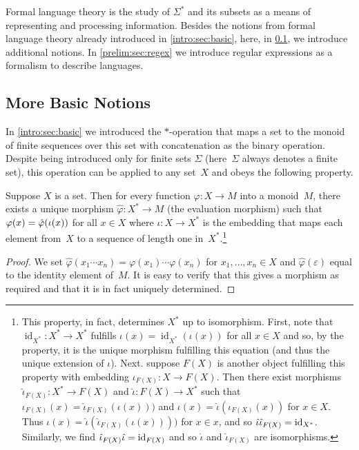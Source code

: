 
Formal language theory is the study of $\Sigma^*$ and its subsets as a means of representing and processing information.
Besides the notions from formal language theory already introduced in \cref{intro:sec:basic},
here, in \cref{prelim:sec:formallang:basics}, 
we introduce additional notions. In \cref{prelim:sec:regex} we introduce regular expressions 
as a formalism to describe languages.

\subsection{More Basic Notions}
\label{prelim:sec:formallang:basics}

In \cref{intro:sec:basic} we introduced the $*$-operation that maps a set to the monoid
of finite sequences over this set with concatenation as the binary operation.
Despite being introduced only for finite sets $\Sigma$ (here~$\Sigma$ always denotes a finite set),
this operation can be applied to any set~$X$ and obeys the following property.

\begin{proposition} 
	\label{prelim:prop:UMP}
	Suppose $X$ is a set. Then for every function $\varphi \colon X \to M$
	into a monoid~$M$, there exists a unique morphism $\hat \varphi \colon X^* \to M$ (the evaluation morphism)
	such that $\varphi(x) = \hat \varphi(\iota(x))$ for all $x \in X$
	where $\iota \colon X \to X^*$ is the embedding that maps each element from~$X$
	to a sequence of length one in~$X^*$.\footnote{This property, in fact,
		determines $X^*$ up to isomorphism.
		First, note that $\operatorname{id}_{X^*} \colon X^* \to X^*$
		fulfills $\iota(x) = \operatorname{id}_{X^*}(\iota(x))$ for all $x \in X$
		and so, by the property, it is the unique morphism
		fulfilling this equation (and thus the unique extension of $\iota$).		
		Next. suppose $F(X)$ is another object fulfilling this property
		with embedding $\iota_{F(X)} \colon X \to F(X)$.
		Then there exist morphisms $\hat{\iota}_{F(X)} \colon X^* \to F(X)$
		and $\hat{\iota} \colon F(X) \to X^*$
		such that $\iota_{F(X)}(x) = \hat{\iota}_{F(X)}(\iota(x)))$
		and $\iota(x) = \hat{\iota}(\iota_{F(X)}(x))$
		for $x \in X$.
		Thus $\iota(x) = \hat{\iota}(\hat{\iota}_{F(X)}(\iota(x))))$
		for $x \in x$, and so $\hat{\iota} \hat{\iota}_{F(X)} = \operatorname{id}_{X^*}$.
        Similarly, we find $\hat{\iota}_{F(X)} \hat{\iota} = \operatorname{id}_{F(X)}$
        and so $\hat{\iota}$ and $\hat{\iota}_{F(X)}$
        are isomorphisms.}		
\end{proposition}
\begin{proof} 
	We set $\hat{\varphi}(x_1 \cdots x_n) = \varphi(x_1) \cdots \varphi(x_n)$
	for $x_1, \ldots, x_n \in X$
	and $\hat{\varphi}(\varepsilon)$ equal to the identity element of~$M$.
	It is easy to verify that
	this gives a morphism as required and that it is in fact uniquely determined.
\end{proof}

